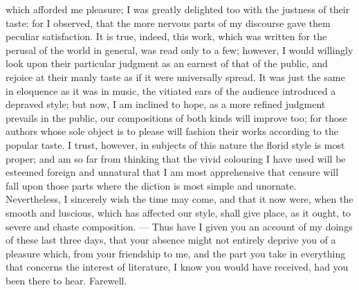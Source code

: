 which afforded me pleasure; I was greatly delighted too with the justness
of their taste: for I observed, that the more nervous parts of my
discourse gave them peculiar satisfaction. It is true, indeed, this work,
which was written for the perusal of the world in general, was read only
to a few; however, I would willingly look upon their particular judgment
as an earnest of that of the public, and rejoice at their manly taste as
if it were universally spread. It was just the same in eloquence as it was
in music, the vitiated ears of the audience introduced a depraved style;
but now, I am inclined to hope, as a more refined judgment prevails in the
public, our compositions of both kinds will improve too; for those authors
whose sole object is to please will fashion their works according to the
popular taste. I trust, however, in subjects of this nature the florid
style is most proper; and am so far from thinking that the vivid colouring
I have used will be esteemed foreign and unnatural that I am most
apprehensive that censure will fall upon those parts where the diction is
most simple and unornate. Nevertheless, I sincerely wish the time may
come, and that it now were, when the smooth and luscious, which has
affected our style, shall give place, as it ought, to severe and chaste
composition. — Thus have I given you an account of my doings of
these last three days, that your absence might not entirely deprive you of
a pleasure which, from your friendship to me, and the part you take in
everything that concerns the interest of literature, I know you would have
received, had you been there to hear. Farewell.


